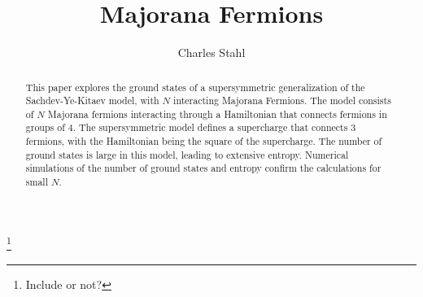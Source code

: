\documentclass[12pt]{article} %
\begin{document}
\title{\textbf{Majorana Fermions}}
\author{Charles Stahl}

\maketitle

\begin{abstract}
	This paper explores the ground states of a supersymmetric generalization of the Sachdev-Ye-Kitaev model, with $N$ interacting Majorana Fermions. The model consists of $N$ Majorana fermions interacting through a Hamiltonian that connects fermions in groups of 4. The supersymmetric model defines a supercharge that connects 3 fermions, with the Hamiltonian being the square of the supercharge. The number of ground states is large in this model, leading to extensive entropy. Numerical simulations of the number of ground states and entropy confirm the calculations for small $N$. 
\end{abstract}

\tableofcontents\footnote{Include or not?}
\newpage
\end{document}
